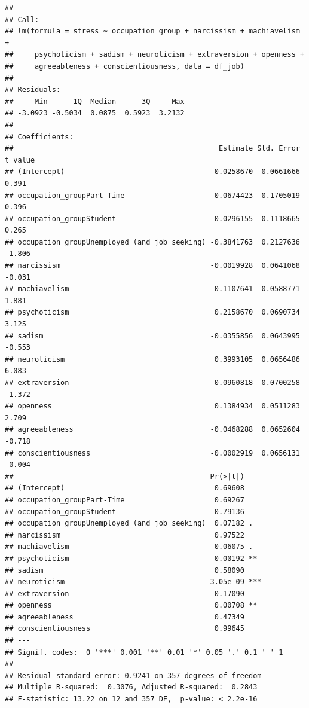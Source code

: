 \documentclass[
]{article}
\begin{document}
\begin{verbatim}
## 
## Call:
## lm(formula = stress ~ occupation_group + narcissism + machiavelism + 
##     psychoticism + sadism + neuroticism + extraversion + openness + 
##     agreeableness + conscientiousness, data = df_job)
## 
## Residuals:
##     Min      1Q  Median      3Q     Max 
## -3.0923 -0.5034  0.0875  0.5923  3.2132 
## 
## Coefficients:
##                                                Estimate Std. Error t value
## (Intercept)                                   0.0258670  0.0661666   0.391
## occupation_groupPart-Time                     0.0674423  0.1705019   0.396
## occupation_groupStudent                       0.0296155  0.1118665   0.265
## occupation_groupUnemployed (and job seeking) -0.3841763  0.2127636  -1.806
## narcissism                                   -0.0019928  0.0641068  -0.031
## machiavelism                                  0.1107641  0.0588771   1.881
## psychoticism                                  0.2158670  0.0690734   3.125
## sadism                                       -0.0355856  0.0643995  -0.553
## neuroticism                                   0.3993105  0.0656486   6.083
## extraversion                                 -0.0960818  0.0700258  -1.372
## openness                                      0.1384934  0.0511283   2.709
## agreeableness                                -0.0468288  0.0652604  -0.718
## conscientiousness                            -0.0002919  0.0656131  -0.004
##                                              Pr(>|t|)    
## (Intercept)                                   0.69608    
## occupation_groupPart-Time                     0.69267    
## occupation_groupStudent                       0.79136    
## occupation_groupUnemployed (and job seeking)  0.07182 .  
## narcissism                                    0.97522    
## machiavelism                                  0.06075 .  
## psychoticism                                  0.00192 ** 
## sadism                                        0.58090    
## neuroticism                                  3.05e-09 ***
## extraversion                                  0.17090    
## openness                                      0.00708 ** 
## agreeableness                                 0.47349    
## conscientiousness                             0.99645    
## ---
## Signif. codes:  0 '***' 0.001 '**' 0.01 '*' 0.05 '.' 0.1 ' ' 1
## 
## Residual standard error: 0.9241 on 357 degrees of freedom
## Multiple R-squared:  0.3076, Adjusted R-squared:  0.2843 
## F-statistic: 13.22 on 12 and 357 DF,  p-value: < 2.2e-16
\end{verbatim}
\end{document}
